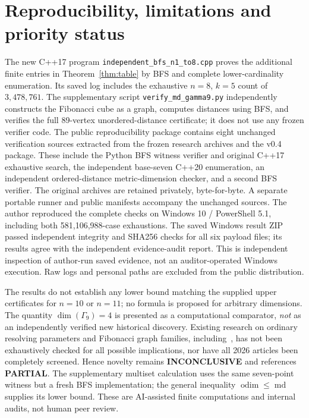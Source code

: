 \documentclass[10pt,a4paper]{article}
\newcommand{\odim}{\operatorname{odim}}
\newcommand{\md}{\operatorname{md}}
\newcommand{\G}{\Gamma}
\begin{document}
\section{Reproducibility, limitations and priority status}
The new C++17 program \texttt{independent\_bfs\_n1\_to8.cpp} proves the
additional finite entries in Theorem~\ref{thm:table} by BFS and complete lower-cardinality enumeration.
Its saved log includes the exhaustive $n=8$, $k=5$ count of $3{,}478{,}761$.
The supplementary script \texttt{verify\_md\_gamma9.py} independently constructs the
Fibonacci cube as a graph, computes distances using BFS, and verifies the full
89-vertex unordered-distance certificate; it does not use any frozen verifier code.
The public reproducibility package contains eight unchanged verification sources extracted
from the frozen research archives and the v0.4 package. These include the Python BFS
witness verifier and original C++17 exhaustive search, the independent base-seven C++20
enumeration, an independent ordered-distance metric-dimension checker, and a second BFS
verifier. The original archives are retained privately, byte-for-byte. A separate portable
runner and public manifests accompany the unchanged sources.
The author reproduced the complete checks on Windows 10 / PowerShell 5.1, including both
581,106,988-case exhaustions. The saved Windows result ZIP passed independent integrity
and SHA256 checks for all six payload files; its results agree with the independent
evidence-audit report. This is independent inspection of author-run saved evidence,
not an auditor-operated Windows execution. Raw logs and personal paths are excluded
from the public distribution.

The results do not establish any lower bound matching the supplied upper certificates
for $n=10$ or $n=11$; no formula is proposed for arbitrary dimensions.
The quantity $\dim(\G_9)=4$ is presented as a computational comparator,
\emph{not} as an independently verified new historical discovery.
Existing research on ordinary resolving parameters and
Fibonacci graph families, including~\cite{Monica2017}, has not been exhaustively
checked for all possible implications, nor have all 2026 articles been completely
screened. Hence novelty remains \textbf{INCONCLUSIVE} and references \textbf{PARTIAL}.
The supplementary multiset calculation uses the same seven-point witness but a fresh
BFS implementation; the general inequality $\odim\le\md$ supplies its lower bound.
These are AI-assisted finite computations and internal audits, not human peer review.
\end{document}
